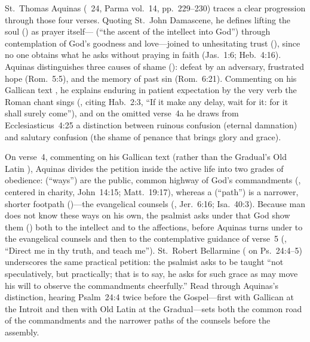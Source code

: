 St.~Thomas Aquinas (~24, Parma vol.~14, pp.~229--230) traces a clear progression through those four verses. Quoting St.~John Damascene, he defines lifting the soul () as prayer itself--- (``the ascent of the intellect into God'') through contemplation of God's goodness and love---joined to unhesitating trust (), since no one obtains what he asks without praying in faith (Jas.~1:6; Heb.~4:16). Aquinas distinguishes three causes of shame (): defeat by an adversary, frustrated hope (Rom.~5:5), and the memory of past sin (Rom.~6:21). Commenting on his Gallican text , he explains enduring in patient expectation by the very verb the Roman chant sings (, citing Hab.~2:3, ``If it make any delay, wait for it: for it shall surely come''), and on the omitted verse~4a he draws from Ecclesiasticus~4:25 a distinction between ruinous confusion (eternal damnation) and salutary confusion (the shame of penance that brings glory and grace).

On verse~4, commenting on his Gallican text  (rather than the Gradual's Old Latin ), Aquinas divides the petition inside the active life into two grades of obedience:  (``ways'') are the public, common highway of God's commandments (, centered in charity, John~14:15; Matt.~19:17), whereas a  (``path'') is a narrower, shorter footpath ()---the evangelical counsels (, Jer.~6:16; Isa.~40:3). Because man does not know these ways on his own, the psalmist asks under  that God show them () both to the intellect and to the affections, before Aquinas turns under  to the evangelical counsels and then to the contemplative guidance of verse~5 (, ``Direct me in thy truth, and teach me''). St.~Robert Bellarmine ( on Ps.~24:4--5) underscores the same practical petition: the psalmist asks to be taught ``not speculatively, but practically; that is to say, he asks for such grace as may move his will to observe the commandments cheerfully.'' Read through Aquinas's distinction, hearing Psalm~24:4 twice before the Gospel---first with Gallican  at the Introit and then with Old Latin  at the Gradual---sets both the common road of the commandments and the narrower paths of the counsels before the assembly.

